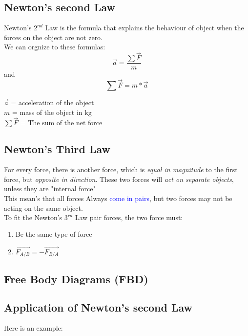 \subsection{Newton's second Law}
Newton's $2^{nd}$ Law is the formula that explains the behaviour of object when the forces on the object 
are not zero. \\
We can orgnize to these formulas:
\begin{equation}
    \vec{a} = \frac{\sum \vec{F}}{m}
\end{equation}
and\\
\begin{equation}
    \sum \vec{F} = m * \vec{a}
\end{equation}
\begin{center}
    $\vec{a}$ = acceleration of the object \\ 
    $m$ = mass of the object in kg \\ 
    $\sum \vec{F}$ = The sum of the net force
\end{center}

\subsection{Newton's Third Law}
For every force, there is another force, which is \textit{equal in magnitude} to the first force, 
but \textit{opposite in direction}. These two forces will \textit{act on separate objects},
unless they are "internal force"\\ 
This mean's that all forces Always \textcolor{blue}{come in pairs}, but two forces may not be 
acting on the same object. \\

To fit the Newton's $3^{rd}$ Law pair forces, the two force must:
\begin{enumerate}
    \item Be the same type of force
    \item $\vec{F_{A/B}} = -\vec{F_{B/A}}$
\end{enumerate}
\newpage
\subsection{Free Body Diagrams (FBD)}

\subsection{Application of Newton's second Law}
Here is an example:

